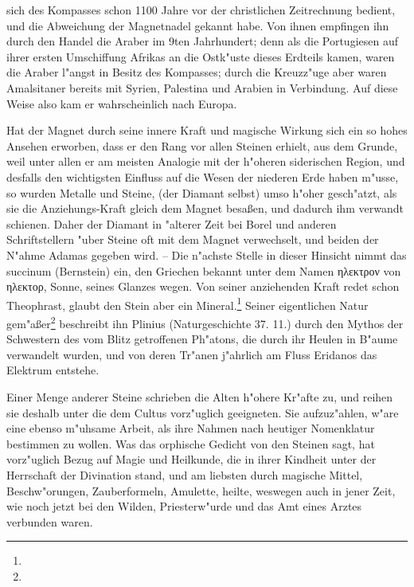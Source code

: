 \documentclass[a4paper, 11pt, oneside, polutonikogreek, german]{article}
\begin{document}
sich des Kompasses schon 1100 Jahre vor der christlichen Zeitrechnung bedient, und die Abweichung der Magnetnadel gekannt habe. Von ihnen empfingen ihn durch den Handel die Araber im 9ten Jahrhundert; denn als die Portugiesen auf ihrer ersten Umschiffung Afrikas an die Ostk"uste dieses Erdteils kamen, waren die Araber l"angst in Besitz des Kompasses; durch die Kreuzz"uge aber waren Amalsitaner bereits mit Syrien, Palestina und Arabien in Verbindung. Auf diese Weise also kam er wahrscheinlich nach Europa.

Hat der Magnet durch seine innere Kraft und magische Wirkung sich ein so hohes Ansehen erworben, dass er den Rang vor allen Steinen erhielt, aus dem Grunde, weil unter allen er am meisten Analogie mit der h"oheren siderischen Region, und desfalls den wichtigsten Einfluss auf die Wesen der niederen Erde haben m"usse, so wurden Metalle und Steine, (der Diamant selbst) umso h"oher gesch"atzt, als sie die Anziehungs-Kraft gleich dem Magnet besaßen, und dadurch ihm verwandt schienen. Daher der Diamant in "alterer Zeit bei Borel und anderen Schriftstellern "uber Steine oft mit dem Magnet verwechselt, und beiden der N"ahme Adamas gegeben wird. -- Die n"achste Stelle in dieser Hinsicht nimmt das succinum (Bernstein) ein, den Griechen bekannt unter dem Namen ηλεκτρον von ηλεκτορ, Sonne, seines Glanzes wegen. Von seiner anziehenden Kraft redet schon Theophrast, glaubt den Stein aber ein Mineral.\footnote{} Seiner eigentlichen Natur gem"aßer\footnote{} beschreibt ihn Plinius (Naturgeschichte 37. 11.) durch den Mythos der Schwestern des vom Blitz getroffenen Ph"atons, die durch ihr Heulen in B"aume verwandelt wurden, und von deren Tr"anen j"ahrlich am Fluss Eridanos das Elektrum entstehe.

Einer Menge anderer Steine schrieben die Alten h"ohere Kr"afte zu, und reihen sie deshalb unter die dem Cultus vorz"uglich geeigneten. Sie aufzuz"ahlen, w"are eine ebenso m"uhsame Arbeit, als ihre Nahmen nach heutiger Nomenklatur bestimmen zu wollen. Was das orphische Gedicht von den Steinen sagt, hat vorz"uglich Bezug auf Magie und Heilkunde, die in ihrer Kindheit unter der Herrschaft der Divination stand, und am liebsten durch magische Mittel, Beschw"orungen, Zauberformeln, Amulette, heilte, weswegen auch in jener Zeit, wie noch jetzt bei den Wilden, Priesterw"urde und das Amt eines Arztes verbunden waren.
\end{document}
